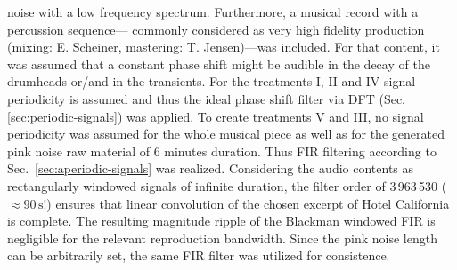 noise with a low frequency spectrum.
%
Furthermore, a musical record with a percussion sequence---%
commonly considered as very high fidelity production (mixing: E. Scheiner,
mastering: T. Jensen)---was included.
For that content, it was assumed that a constant phase shift might be audible
in the decay of the drumheads or/and in the transients.
%
\NewL For the treatments I, II and IV signal periodicity is assumed and thus
the ideal phase shift filter via DFT (Sec. \ref{sec:periodic-signals}) was
applied.
%
To create treatments V and III, no signal periodicity was assumed for the
whole musical piece as well as for the generated pink noise raw material of 6 minutes
duration.
%
Thus FIR filtering according to Sec.~\ref{sec:aperiodic-signals} was realized.
%
Considering the audio contents as rectangularly windowed signals of infinite
duration, the filter order of 3\,963\,530 ($\approx 90\,\text{s}$!) ensures
that linear convolution of the chosen excerpt of Hotel California is complete.
%
The resulting magnitude ripple of the Blackman windowed FIR is negligible
for the relevant reproduction bandwidth.
%
Since the pink noise length can be arbitrarily set, the same FIR filter was utilized
for consistence.
%
%
%
